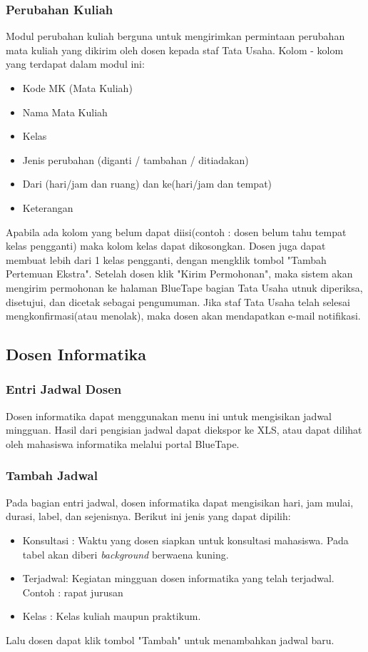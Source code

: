\subsubsection{Perubahan Kuliah}
Modul perubahan kuliah berguna untuk mengirimkan permintaan perubahan mata kuliah yang dikirim oleh dosen kepada staf Tata Usaha. Kolom - kolom yang terdapat dalam modul ini:
\begin{itemize}
	\item Kode MK (Mata Kuliah)
	\item Nama Mata Kuliah
	\item Kelas
	\item Jenis perubahan (diganti / tambahan / ditiadakan)
	\item Dari (hari/jam dan ruang) dan ke(hari/jam dan tempat)
	\item Keterangan
\end{itemize}
Apabila ada kolom yang belum dapat diisi(contoh : dosen belum tahu tempat kelas pengganti) maka kolom kelas dapat dikosongkan. \noindent
Dosen juga dapat membuat lebih dari 1 kelas pengganti, dengan mengklik tombol "Tambah Pertemuan Ekstra". \noindent
Setelah dosen klik "Kirim Permohonan", maka sistem akan mengirim permohonan ke halaman BlueTape bagian Tata Usaha utnuk diperiksa, disetujui, dan dicetak sebagai pengumuman. Jika staf Tata Usaha telah selesai mengkonfirmasi(atau menolak), maka dosen akan mendapatkan e-mail notifikasi.

\subsection{Dosen Informatika}
\subsubsection{Entri Jadwal Dosen}
Dosen informatika dapat menggunakan menu ini untuk mengisikan jadwal mingguan. Hasil dari pengisian jadwal dapat diekspor ke XLS, atau dapat dilihat oleh mahasiswa informatika melalui portal BlueTape.
\subsubsection{Tambah Jadwal}
Pada bagian entri jadwal, dosen informatika dapat mengisikan hari, jam mulai, durasi, label, dan sejenisnya. Berikut ini jenis yang dapat dipilih:
\begin{itemize}
	\item Konsultasi : Waktu yang dosen siapkan untuk konsultasi mahasiswa. Pada tabel akan diberi \textit{background} berwaena kuning.
	\item Terjadwal: Kegiatan mingguan dosen informatika yang telah terjadwal. Contoh : rapat jurusan
	\item Kelas : Kelas kuliah maupun praktikum.
\end{itemize}
Lalu dosen dapat klik tombol "Tambah" untuk menambahkan jadwal baru.


